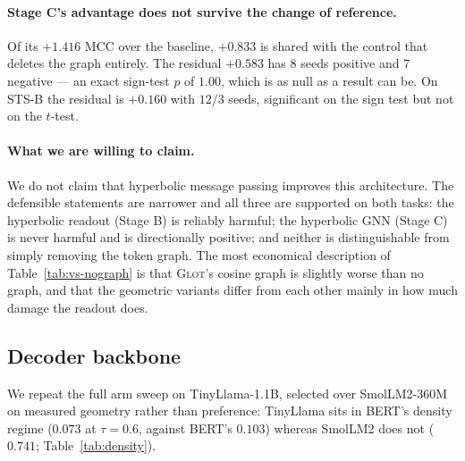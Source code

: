 \documentclass{article} %
\begin{document}
\paragraph{Stage C's advantage does not survive the change of reference.} Of
its $+1.416$ MCC over the baseline, $+0.833$ is shared with the control that
deletes the graph entirely. The residual $+0.583$ has $8$ seeds positive and
$7$ negative --- an exact sign-test $p$ of $1.00$, which is as null as a result
can be. On STS-B the residual is $+0.160$ with $12/3$ seeds, significant on the
sign test but not on the $t$-test.

\paragraph{What we are willing to claim.} We do not claim that hyperbolic
message passing improves this architecture. The defensible statements are
narrower and all three are supported on both tasks: the hyperbolic readout
(Stage B) is reliably harmful; the hyperbolic GNN (Stage C) is never harmful
and is directionally positive; and neither is distinguishable from simply
removing the token graph. The most economical description of
Table~\ref{tab:vs-nograph} is that \textsc{Glot}'s cosine graph is slightly
worse than no graph, and that the geometric variants differ from each other
mainly in how much damage the readout does.

\subsection{Decoder backbone}
\label{sec:decoder}
We repeat the full arm sweep on TinyLlama-1.1B, selected over SmolLM2-360M on
measured geometry rather than preference: TinyLlama sits in BERT's density
regime ($0.073$ at $\tau=0.6$, against BERT's $0.103$) whereas SmolLM2 does not
($0.741$; Table~\ref{tab:density}).
\end{document}
